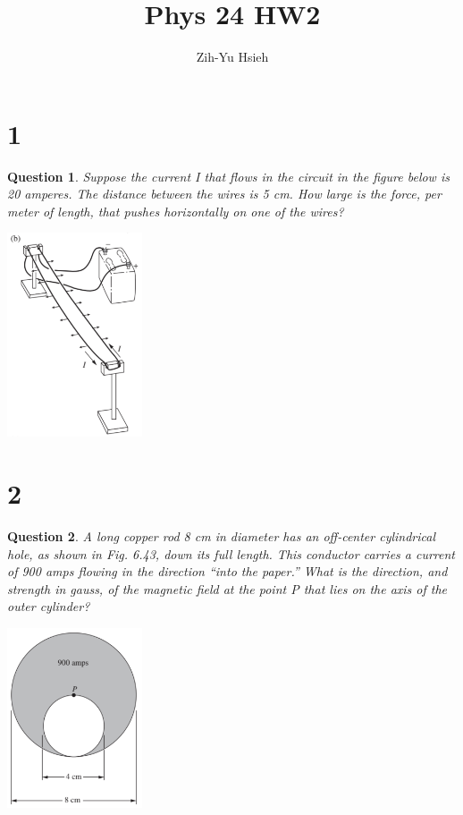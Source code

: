 \documentclass{article}
\title{Phys 24 HW2}
\author{Zih-Yu Hsieh}
\newtheorem{question}{Question}
\begin{document}
\maketitle

\section*{1}
\begin{myBox}[]{}
    \begin{question}
        Suppose the current I that flows in the circuit in the figure below is
        20 amperes. The distance between the wires is 5 cm. How large
        is the force, per meter of length, that pushes horizontally on one of
        the wires?
    \end{question}

    \begin{center}
        \includegraphics*[width=40mm]{Purcell 6.33.png}
    \end{center}
\end{myBox}

\break

\section*{2}
\begin{myBox}[]{}
    \begin{question}
        A long copper rod 8 cm in diameter has an off-center cylindrical
        hole, as shown in Fig. 6.43, down its full length. This conductor
        carries a current of 900 amps flowing in the direction “into the
        paper.” What is the direction, and strength in gauss, of the magnetic
        field at the point P that lies on the axis of the outer cylinder?
    \end{question}

    \begin{center}
        \includegraphics*[width=40mm]{Purcell 6.37.png}
    \end{center}
\end{myBox}
\end{document}

